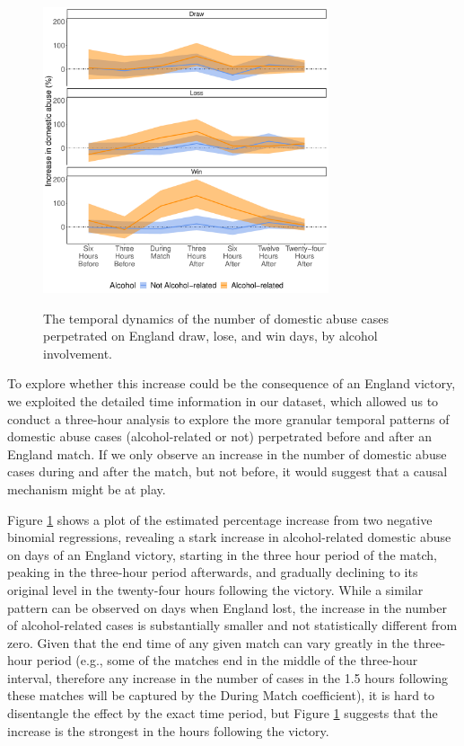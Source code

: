 \documentclass[12pt, a4paper]{article}
\begin{document}
 \begin{figure}[!htbp]
\centering
 \caption{The temporal dynamics of the number of domestic abuse cases perpetrated on England draw, lose, and win days, by alcohol involvement.}
\includegraphics[width=0.75\textwidth]{Threehours_newdata.pdf}
\label{fig:threehours}
\end{figure}
 
 To explore whether this increase could be the consequence of an England victory, we exploited the detailed time information in our dataset, which allowed us to conduct a three-hour analysis to explore the more granular temporal patterns of domestic abuse cases (alcohol-related or not) perpetrated before and after an England match. If we only observe an increase in the number of domestic abuse cases during and after the match, but not before, it would suggest that a causal mechanism might be at play. 
 
 
  Figure \ref{fig:threehours} shows a plot of the estimated percentage increase from two negative binomial regressions, revealing a stark increase in alcohol-related domestic abuse on days of an England victory, starting in the three hour period of the match, peaking in the three-hour period afterwards, and gradually declining to its original level in the twenty-four hours following the victory. While a similar pattern can be observed on days when England lost, the increase in the number of alcohol-related cases is substantially smaller and not statistically different from zero. Given that the end time of any given match can vary greatly in the three-hour period (e.g., some of the matches end in the middle of the three-hour interval, therefore any increase in the number of cases in the 1.5 hours following these matches will be captured by the During Match coefficient), it is hard to disentangle the effect by the exact time period, but Figure \ref{fig:threehours} suggests that the increase is the strongest in the hours following the victory. 
 
\end{document}
